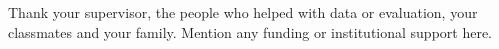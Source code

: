 \begin{acknowledgements}
Thank your supervisor, the people who helped with data or evaluation, your classmates and
your family. Mention any funding or institutional support here.
\end{acknowledgements}
